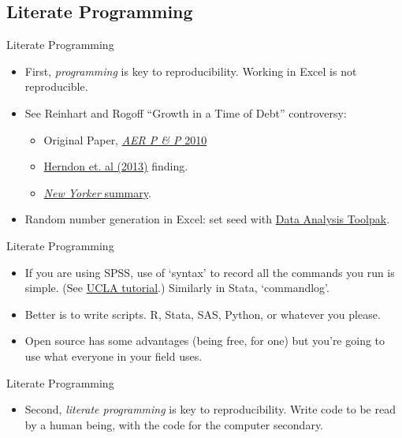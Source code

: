 \documentclass{beamer}
\begin{document}
\subsection{Literate Programming}
\begin{frame}{Literate Programming}
\begin{itemize}
\item First, \textit{programming} is key to reproducibility. Working in Excel is not reproducible.
\item See Reinhart and Rogoff ``Growth in a Time of Debt'' controversy: 
\begin{itemize}
	\item
	Original Paper, \href{https://www.aeaweb.org/articles.php?doi=10.1257/aer.100.2.573}{\textit{AER P \& P} 2010}
	\item 
	\href{http://cje.oxfordjournals.org/content/38/2/257}{Herndon et. al (2013)} finding.
	\item \href{http://www.newyorker.com/news/john-cassidy/the-reinhart-and-rogoff-controversy-a-summing-up}{\textit{New Yorker} summary}.
\end{itemize}

\item Random number generation in Excel: set seed with \href{http://www.statisticshowto.com/use-random-number-generator-excel/}{Data Analysis Toolpak}. 
\end{itemize}
\end{frame}

\begin{frame}{Literate Programming}
\begin{itemize}
\item  If you are using SPSS, use of `syntax' to record all the commands you run is simple. (See \href{http://www.ats.ucla.edu/stat/spss/seminars/spss_syntax/}{UCLA tutorial}.) Similarly in Stata, `commandlog'.

\item Better is to write scripts. R, Stata, SAS, Python, or whatever you please.

\item Open source has some advantages (being free, for one) but you're going to use what everyone in your field uses.
\end{itemize}
\end{frame}

\begin{frame}{Literate Programming}
\begin{itemize}
\item
Second, \textit{literate programming} is key to reproducibility. Write code to be read by a human being, with the code for the computer secondary.
\end{itemize}
\end{frame}
\end{document}
